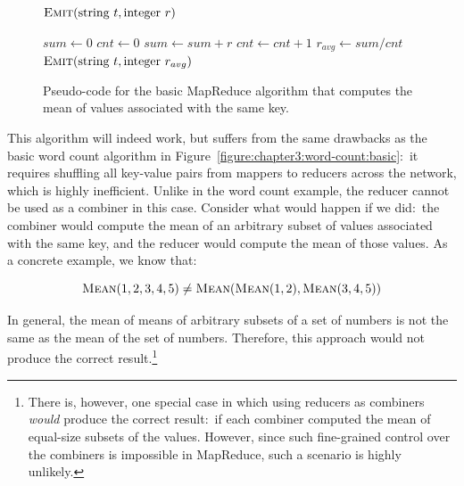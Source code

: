 \begin{figure}[t]
\algrenewcommand{}
\algrenewcommand{}
  \begin{algorithmic}[1]
    \State $\textsc{Emit}(\textrm{string }t, \textrm{integer }r)$
    \EndProcedure
    \EndFunction
  \end{algorithmic}

  \begin{algorithmic}[1]
    \State $sum \gets 0$
    \State $cnt \gets 0$
    \State $sum \gets sum + r$
    \State $cnt \gets cnt + 1$
    \EndFor
    \State $r_{avg} \gets sum/cnt$
    \State $\textsc{Emit}(\textrm{string }t, \textrm{integer } r_{avg})$
    \EndProcedure
    \EndFunction
  \end{algorithmic}
  \caption{Pseudo-code for the basic MapReduce algorithm that computes
    the mean of values associated with the same key.}
\label{figure:chapter3:average}
\end{figure}

This algorithm will indeed work, but suffers from the same drawbacks
as the basic word count algorithm in
Figure~\ref{figure:chapter3:word-count:basic}:\ it requires shuffling
all key-value pairs from mappers to reducers across the network, which
is highly inefficient.  Unlike in the word count example, the reducer
cannot be used as a combiner in this case.  Consider what would happen
if we did:\ the combiner would compute the mean of an arbitrary subset
of values associated with the same key, and the reducer would compute
the mean of those values.  As a concrete example, we know that:

\begin{equation}
\textsc{Mean}(1, 2, 3, 4, 5) \ne \textsc{Mean}( \textsc{Mean}(1, 2), \textsc{Mean}(3, 4, 5))
\end{equation}

\noindent In general, the mean of means of arbitrary subsets of a set
of numbers is not the same as the mean of the set of numbers.
Therefore, this approach would not produce the correct
result.\footnote{There is, however, one special case in which using
  reducers as combiners \emph{would} produce the correct result:\ if
  each combiner computed the mean of equal-size subsets of the values.
  However, since such fine-grained control over the combiners is
  impossible in MapReduce, such a scenario is highly unlikely.}

